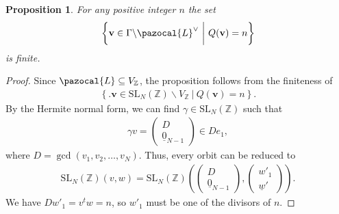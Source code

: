 \documentclass[a4paper,11pt]{amsart} %
\newcommand{\8}{\infty}
\newcommand{\Z}{\mathbb{Z}}
\newcommand{\Obf}{\underline{0}}
\newcommand{\wud}{\underline{w}}
\newcommand{\vbf}{\mathbf{v}}
\newcommand{\SL}{\mathrm{SL}}
\newcommand{\GL}{\mathrm{GL}}
\newcommand{\R}{\mathbb{R}}
\newcommand{\Lcal}{\pazocal{L}}
\theoremstyle{mytheoremstyle}
\newtheorem{prop}[thm]{Proposition}
\theoremstyle{remark}
\numberwithin{equation}{section}
\begin{document}
\begin{prop} \label{finiterep} For any positive integer $n$ the set 
    \begin{align}
    \left \{ \biggl . \vbf \in \Gamma \backslash \Lcal^\vee \ \biggr \vert \ Q(\vbf)=n \right \}    
    \end{align} is finite.
\end{prop}
\begin{proof}  %
Since $\Lcal \subseteq V_\Z$, the proposition follows from the finiteness of
 \begin{align}
    \left \{ \biggl . \vbf \in  \SL_N(\Z) \backslash V_\Z \ \biggr  \vert \ Q(\vbf)=n \right \}.    
    \end{align}
By the Hermite normal form, we can find $\gamma \in \SL_N(\Z)$ such that 
\begin{align}
    \gamma v = \begin{pmatrix}
        D \\ \Obf_{N-1}
    \end{pmatrix} \in De_1,
\end{align} where $D=\gcd(v_1,v_2,\dots,v_N)$. Thus, every orbit can be reduced to
\begin{align}
    \SL_N(\Z)(v,w)=\SL_N(\Z) \left (\begin{pmatrix}
        D \\ \Obf_{N-1}
    \end{pmatrix},\begin{pmatrix}
        w'_1 \\ \wud'
    \end{pmatrix} \right ).
\end{align}
We have $Dw'_1=v^tw=n$, so $w'_1$ must be one of the divisors of $n$.


\end{proof}
\end{document}
